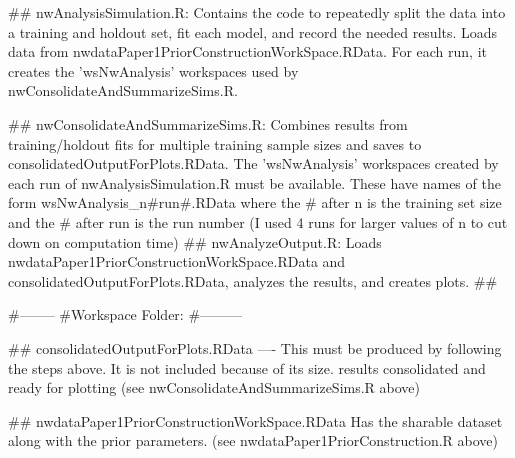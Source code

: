 ## 
nwAnalysisSimulation.R:   
	Contains the code to repeatedly split the data into a training and holdout set, fit each model, and record the needed results. Loads data from nwdataPaper1PriorConstructionWorkSpace.RData. For each run, it creates the 'wsNwAnalysis' workspaces used by nwConsolidateAndSummarizeSims.R.

## 
nwConsolidateAndSummarizeSims.R: 
	Combines results from training/holdout fits for multiple training sample sizes and saves to consolidatedOutputForPlots.RData.
	The 'wsNwAnalysis' workspaces created by each run of nwAnalysisSimulation.R must be available. These have names of the form wsNwAnalysis_n#run#.RData where 	the # after n is the training set size and the # after run is the run number (I used 4 runs for larger values of n to cut down on computation time)
## 
nwAnalyzeOutput.R: 
	Loads nwdataPaper1PriorConstructionWorkSpace.RData and consolidatedOutputForPlots.RData, analyzes the results, and creates plots.
## 
	
	

#--------
#Workspace Folder: 
#---------

##
consolidatedOutputForPlots.RData ---- This must be produced by following the steps above. It is not included because of its size. 
	results consolidated and ready for plotting (see nwConsolidateAndSummarizeSims.R above)
  	
##
nwdataPaper1PriorConstructionWorkSpace.RData
	Has the sharable dataset along with the prior parameters.  (see nwdataPaper1PriorConstruction.R above)



	